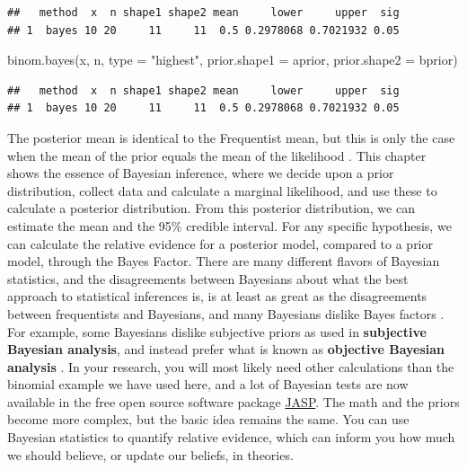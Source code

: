 \documentclass[
  oneside]{book}
\newenvironment{Shaded}{\begin{snugshade}}{\end{snugshade}}
\newcommand{\AttributeTok}[1]{\textcolor[rgb]{0.77,0.63,0.00}{#1}}
\newcommand{\FunctionTok}[1]{\textcolor[rgb]{0.00,0.00,0.00}{#1}}
\newcommand{\NormalTok}[1]{#1}
\newcommand{\StringTok}[1]{\textcolor[rgb]{0.31,0.60,0.02}{#1}}
\begin{document}
\begin{verbatim}
##   method  x  n shape1 shape2 mean     lower     upper  sig
## 1  bayes 10 20     11     11  0.5 0.2978068 0.7021932 0.05
\end{verbatim}

\begin{Shaded}
\begin{Highlighting}[]
\FunctionTok{binom.bayes}\NormalTok{(x, n, }\AttributeTok{type =} \StringTok{"highest"}\NormalTok{, }\AttributeTok{prior.shape1 =}\NormalTok{ aprior, }\AttributeTok{prior.shape2 =}\NormalTok{ bprior)}
\end{Highlighting}
\end{Shaded}

\begin{verbatim}
##   method  x  n shape1 shape2 mean     lower     upper  sig
## 1  bayes 10 20     11     11  0.5 0.2978068 0.7021932 0.05
\end{verbatim}

The posterior mean is identical to the Frequentist mean, but this is only the case when the mean of the prior equals the mean of the likelihood \citep{albers_credible_2018}. This chapter shows the essence of Bayesian inference, where we decide upon a prior distribution, collect data and calculate a marginal likelihood, and use these to calculate a posterior distribution. From this posterior distribution, we can estimate the mean and the 95\% credible interval. For any specific hypothesis, we can calculate the relative evidence for a posterior model, compared to a prior model, through the Bayes Factor. There are many different flavors of Bayesian statistics, and the disagreements between Bayesians about what the best approach to statistical inferences is, is at least as great as the disagreements between frequentists and Bayesians, and many Bayesians dislike Bayes factors \citep{mcelreath_statistical_2016}. For example, some Bayesians dislike subjective priors as used in \textbf{subjective Bayesian analysis}, and instead prefer what is known as \textbf{objective Bayesian analysis} \citep{berger_interplay_2004}. In your research, you will most likely need other calculations than the binomial example we have used here, and a lot of Bayesian tests are now available in the free open source software package \href{https://jasp-stats.org/}{JASP}. The math and the priors become more complex, but the basic idea remains the same. You can use Bayesian statistics to quantify relative evidence, which can inform you how much we should believe, or update our beliefs, in theories.
\end{document}

